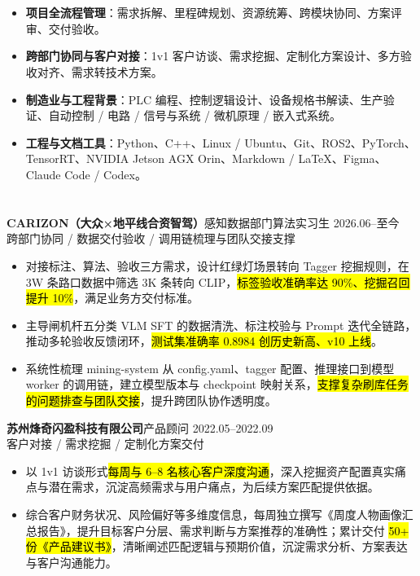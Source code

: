 \section[专业技能]{}
\begin{itemize}
    \item \textbf{项目全流程管理}：需求拆解、里程碑规划、资源统筹、跨模块协同、方案评审、交付验收。
    \item \textbf{跨部门协同与客户对接}：1v1 客户访谈、需求挖掘、定制化方案设计、多方验收对齐、需求转技术方案。
    \item \textbf{制造业与工程背景}：PLC 编程、控制逻辑设计、设备规格书解读、生产验证、自动控制 / 电路 / 信号与系统 / 微机原理 / 嵌入式系统。
    \item \textbf{工程与文档工具}：Python、C++、Linux / Ubuntu、Git、ROS2、PyTorch、TensorRT、NVIDIA Jetson AGX Orin、Markdown / LaTeX、Figma、Claude Code / Codex。
\end{itemize}

\section[实习经历]{}
{\small\textbf{CARIZON（大众×地平线合资智驾）}}\quad 感知数据部门算法实习生 \hfill {2026.06--至今}\\
{\scriptsize\color{WHU_Blue} 跨部门协同 / 数据交付验收 / 调用链梳理与团队交接支撑}
\begin{itemize}
    \item 对接标注、算法、验收三方需求，设计红绿灯场景转向 Tagger 挖掘规则，在 3W 条路口数据中筛选 3K 条转向 CLIP，\hl{标签验收准确率达 90\%、挖掘召回提升 10\%}，满足业务方交付标准。
    \item 主导闸机杆五分类 VLM SFT 的数据清洗、标注校验与 Prompt 迭代全链路，推动多轮验收反馈闭环，\hl{测试集准确率 0.8984 创历史新高、v10 上线}。
    \item 系统性梳理 mining-system 从 config.yaml、tagger 配置、推理接口到模型 worker 的调用链，建立模型版本与 checkpoint 映射关系，\hl{支撑复杂刷库任务的问题排查与团队交接}，提升跨团队协作透明度。
\end{itemize}

\vspace{0.30em}
{\small\textbf{苏州烽奇闪盈科技有限公司}}\quad 产品顾问 \hfill {2022.05--2022.09} \\
{\scriptsize\color{WHU_Blue} 客户对接 / 需求挖掘 / 定制化方案交付}
\begin{itemize}
    \item 以 1v1 访谈形式\hl{每周与 6--8 名核心客户深度沟通}，深入挖掘资产配置真实痛点与潜在需求，沉淀高频需求与用户痛点，为后续方案匹配提供依据。
    \item 综合客户财务状况、风险偏好等多维度信息，每周独立撰写《周度人物画像汇总报告》，提升目标客户分层、需求判断与方案推荐的准确性；累计交付 \hl{50+ 份《产品建议书》}，清晰阐述匹配逻辑与预期价值，沉淀需求分析、方案表达与客户沟通能力。
\end{itemize}

